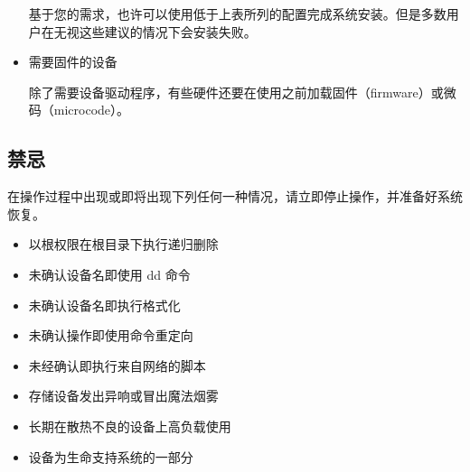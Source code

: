 \documentclass{article}
\begin{document}
\begin{multicols*}{3}
\begin{itemize}[leftmargin=*]
		基于您的需求，也许可以使用低于上表所列的配置完成系统安装。但是多数用户在无视这些建议的情况下会安装失败。

		\item 需要固件的设备

		除了需要设备驱动程序，有些硬件还要在使用之前加载固件（firmware）或微码（microcode）。

	\end{itemize}


	\begin{tcolorbox}
	\section*{禁忌}
	\end{tcolorbox}

	在操作过程中出现或即将出现下列任何一种情况，请立即停止操作，并准备好系统恢复。

	\begin{itemize}[leftmargin=*]
		\setlength{\itemsep}{0pt}
		\setlength{\parskip}{0pt}
		\setlength{\parsep}{0pt}

		\item 以根权限在根目录下执行递归删除
		\item 未确认设备名即使用 dd 命令
		\item 未确认设备名即执行格式化
		\item 未确认操作即使用命令重定向
		\item 未经确认即执行来自网络的脚本
		\item 存储设备发出异响或冒出魔法烟雾
		\item 长期在散热不良的设备上高负载使用
		\item 设备为生命支持系统的一部分
	\end{itemize}







\end{multicols*}
\end{document}
